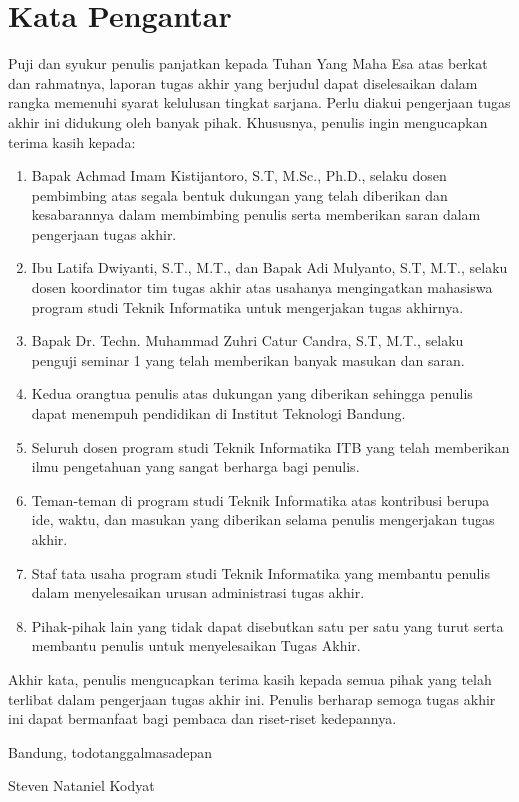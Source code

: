 \chapter*{Kata Pengantar}

Puji dan syukur penulis panjatkan kepada Tuhan Yang Maha Esa atas berkat dan rahmatnya, laporan tugas akhir yang berjudul \thetitle{} dapat diselesaikan dalam rangka memenuhi syarat kelulusan tingkat sarjana. Perlu diakui pengerjaan tugas akhir ini didukung oleh banyak pihak. Khususnya, penulis ingin mengucapkan terima kasih kepada:

\begin{enumerate}
    \item Bapak Achmad Imam Kistijantoro, S.T, M.Sc., Ph.D., selaku dosen pembimbing atas segala bentuk dukungan yang telah diberikan dan kesabarannya dalam membimbing penulis serta memberikan saran dalam pengerjaan tugas akhir.
    \item Ibu Latifa Dwiyanti, S.T., M.T., dan Bapak Adi Mulyanto, S.T, M.T., selaku dosen koordinator tim tugas akhir atas usahanya mengingatkan mahasiswa program studi Teknik Informatika untuk mengerjakan tugas akhirnya.
    \item Bapak Dr. Techn. Muhammad Zuhri Catur Candra, S.T, M.T., selaku penguji seminar 1 yang telah memberikan banyak masukan dan saran.
    \item Kedua orangtua penulis atas dukungan yang diberikan sehingga penulis dapat menempuh pendidikan di Institut Teknologi Bandung.
    \item Seluruh dosen program studi Teknik Informatika ITB yang telah memberikan ilmu pengetahuan yang sangat berharga bagi penulis.
    \item Teman-teman di program studi Teknik Informatika atas kontribusi berupa ide, waktu, dan masukan yang diberikan selama penulis mengerjakan tugas akhir.
    \item Staf tata usaha program studi Teknik Informatika yang membantu penulis dalam menyelesaikan urusan administrasi tugas akhir.
    \item Pihak-pihak lain yang tidak dapat disebutkan satu per satu yang turut serta membantu penulis untuk menyelesaikan Tugas Akhir.
\end{enumerate}

Akhir kata, penulis mengucapkan terima kasih kepada semua pihak yang telah terlibat dalam pengerjaan tugas akhir ini. Penulis berharap semoga tugas akhir ini dapat bermanfaat bagi pembaca dan riset-riset kedepannya.

\begin{flushright}
    Bandung, todotanggalmasadepan

    \vspace{1.5cm}

    Steven Nataniel Kodyat
\end{flushright}
